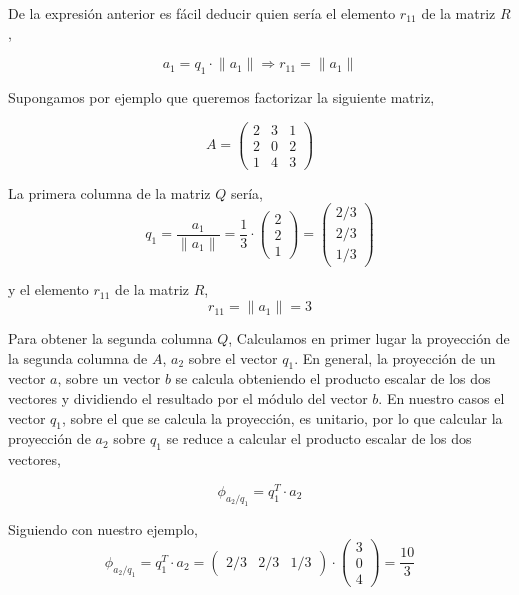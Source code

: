 De la expresión anterior es fácil deducir quien sería el elemento $r_{11}$ de la matriz $R$,

\begin{equation*}
a_1=q_1\cdot \lVert a_1 \rVert \Rightarrow r_{11}= \lVert a_1 \rVert
\end{equation*}

Supongamos por ejemplo que queremos factorizar la siguiente matriz,

\begin{equation*}
A=\begin{pmatrix}
2& 3& 1\\
2& 0& 2\\
1& 4& 3
\end{pmatrix}
\end{equation*}

La primera columna de la matriz $Q$ sería,
\begin{equation*}
q_1=\frac{a_1}{\lVert a_1 \rVert}=\frac{1}{3}\cdot \begin{pmatrix}
2\\
2\\
1
\end{pmatrix}=\begin{pmatrix}
2/3\\
2/3\\
1/3
\end{pmatrix}
\end{equation*}

y el elemento $r_{11}$ de la matriz $R$,
\begin{equation*}
r_{11}=\lVert a_1 \rVert=3
\end{equation*}

Para obtener la segunda columna $Q$, Calculamos en primer lugar la proyección de la segunda columna de $A$, $a_2$ sobre el vector $q_1$. En general, la proyección de un vector $a$, sobre un vector $b$ se calcula obteniendo el producto escalar de los dos vectores y dividiendo el resultado por el módulo del vector $b$. En nuestro casos el vector $q_1$, sobre el que se calcula la proyección, es unitario, por lo que calcular la proyección de $a_2$ sobre $q_1$ se reduce a calcular el producto escalar de los dos vectores,

\begin{equation*}
\phi_{a_2/q_1}=q_1^T\cdot a_2
\end{equation*}

Siguiendo con nuestro ejemplo,
\begin{equation*}
\phi_{a_2/q_1}=q_1^T\cdot a_2=
\begin{pmatrix}
2/3& 2/3& 1/3
\end{pmatrix}\cdot \begin{pmatrix}
3\\
0\\
4
\end{pmatrix}=\frac{10}{3}
\end{equation*}

